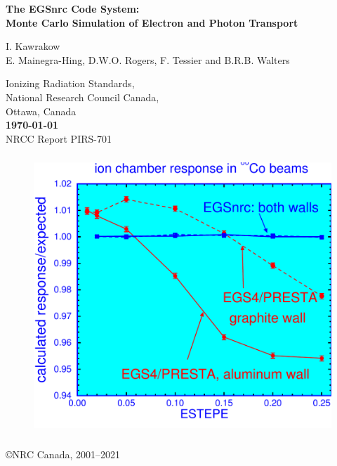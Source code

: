 \documentclass[12pt,twoside]{article}  %
\newcommand{\cen}[1]{\begin{center} #1 \end{center} }
\begin{document}
\begin{center}
{\sffamily \bfseries {\Huge The EGSnrc Code System:}\\
{\Large Monte Carlo Simulation of Electron and Photon Transport
\vspace{5mm}\\}}
\begin{large}
I. Kawrakow\\
E. Mainegra-Hing, D.W.O. Rogers, F. Tessier and B.R.B. Walters\\
\end{large}
Ionizing Radiation Standards,\\
National Research Council Canada,\\
Ottawa, Canada\\

\vspace{10mm}
{\bfseries
\today}
\vspace{5mm}\\
\hfill NRCC Report {\sf PIRS-701} \vspace*{15mm}\\


\begin{figure}[h]
\begin{center}
\leavevmode
\includegraphics[height=10.5cm]{figures/ion_chamber}
\end{center}
\end{figure}
\vfill

\copyright NRC Canada, 2001--2021
\end{center}
\newpage   %
\mbox{}
\end{document}
